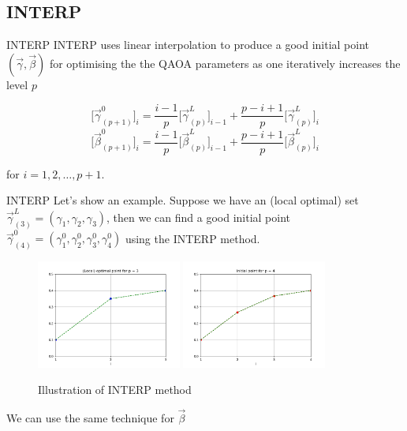 \documentclass{beamer}
\begin{document}
\subsection{INTERP}
\begin{frame}{INTERP}
	INTERP uses linear interpolation to produce a good initial point $(\vec{\gamma},\vec{\beta})$ for optimising the the QAOA parameters as one iteratively increases the level $p$
	
	\begin{equation}
		\Big[\vec{\gamma}_{(p+1)}^0\Big]_i = \frac{i-1}{p}\Big[\vec{\gamma}_{(p)}^L\Big]_{i-1} + \frac{p-i+1}{p}\Big[\vec{\gamma}_{(p)}^L\Big]_i
	\end{equation}
	\begin{equation}
	\Big[\vec{\beta}_{(p+1)}^0\big]_i = \frac{i-1}{p}\Big[\vec{\beta}_{(p)}^L\Big]_{i-1} + \frac{p-i+1}{p}\Big[\vec{\beta}_{(p)}^L\Big]_i
	\end{equation}
	
	for $i = 1, 2, \dots, p+1$. 
\end{frame}

\begin{frame}{INTERP}
	Let's show an example. Suppose we have an (local optimal) set $\vec{\gamma}^L_{(3)} = (\gamma_1, \gamma_2,\gamma_3)$, then we can find a good initial point $\vec{\gamma}^0_{(4)} = (\gamma_1^0, \gamma_2^0,\gamma_3^0, \gamma_4^0)$ using the INTERP method. 
	\begin{figure}%
		\centering
		{{\includegraphics[width=4.75cm]{figures/heuristic_optimal_params.png} }}%
		\qquad 
		{{\includegraphics[width=4.75cm]{figures/heuristic_initial_params.png} }}%
		\caption{Illustration of INTERP method}
	\end{figure}
	We can use the same technique for $\vec{\beta}$
\end{frame}
\end{document}
